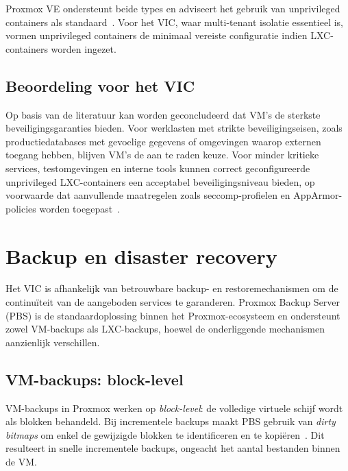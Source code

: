 Proxmox VE ondersteunt beide types en adviseert het gebruik van unprivileged containers als standaard~\autocite{ProxmoxWiki}. Voor het VIC, waar multi-tenant isolatie essentieel is, vormen unprivileged containers de minimaal vereiste configuratie indien LXC-containers worden ingezet.

\subsection{Beoordeling voor het VIC}
\label{subsec:beveiliging-beoordeling}

Op basis van de literatuur kan worden geconcludeerd dat VM's de sterkste beveiligingsgaranties bieden. Voor werklasten met strikte beveiligingseisen, zoals productiedatabases met gevoelige gegevens of omgevingen waarop externen toegang hebben, blijven VM's de aan te raden keuze. Voor minder kritieke services, testomgevingen en interne tools kunnen correct geconfigureerde unprivileged LXC-containers een acceptabel beveiligingsniveau bieden, op voorwaarde dat aanvullende maatregelen zoals seccomp-profielen en AppArmor-policies worden toegepast~\autocite{Aquasec2024, SecurityLabs2023}.

\section{Backup en disaster recovery}
\label{sec:backup-en-disaster-recovery}

Het VIC is afhankelijk van betrouwbare backup- en restoremechanismen om de continuïteit van de aangeboden services te garanderen. Proxmox Backup Server (PBS) is de standaardoplossing binnen het Proxmox-ecosysteem en ondersteunt zowel VM-backups als LXC-backups, hoewel de onderliggende mechanismen aanzienlijk verschillen.

\subsection{VM-backups: block-level}
\label{subsec:vm-backups}

VM-backups in Proxmox werken op \textit{block-level}: de volledige virtuele schijf wordt als blokken behandeld. Bij incrementele backups maakt PBS gebruik van \textit{dirty bitmaps} om enkel de gewijzigde blokken te identificeren en te kopiëren~\autocite{ItNotes2020}. Dit resulteert in snelle incrementele backups, ongeacht het aantal bestanden binnen de VM.


